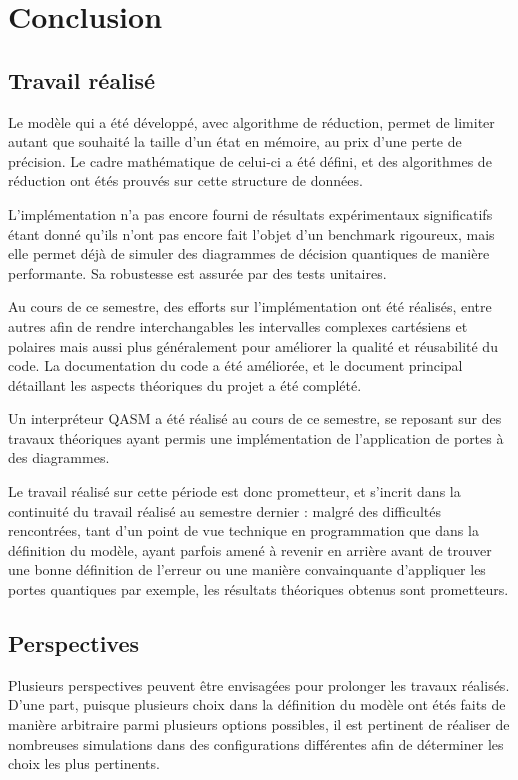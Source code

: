 
\chapter{Conclusion} %
\label{ch:Conclusion}

\section{Travail réalisé}

Le modèle qui a été développé, avec algorithme de réduction, permet de limiter autant que souhaité la taille d'un état en mémoire, au prix d'une perte de précision. Le cadre mathématique de celui-ci a été défini, et des algorithmes de réduction ont étés prouvés sur cette structure de données.

L'implémentation n'a pas encore fourni de résultats expérimentaux significatifs étant donné qu'ils n'ont pas encore fait l'objet d'un benchmark rigoureux, mais elle permet déjà de simuler des diagrammes de décision quantiques de manière performante. Sa robustesse est assurée par des tests unitaires.

Au cours de ce semestre, des efforts sur l'implémentation ont été réalisés, entre autres afin de rendre interchangables les intervalles complexes cartésiens et polaires mais aussi plus généralement pour améliorer la qualité et réusabilité du code. La documentation du code a été améliorée, et le document principal détaillant les aspects théoriques du projet a été complété.

Un interpréteur QASM a été réalisé au cours de ce semestre, se reposant sur des travaux théoriques ayant permis une implémentation de l'application de portes à des diagrammes.

Le travail réalisé sur cette période est donc prometteur, et s'incrit dans la continuité du travail réalisé au semestre dernier : malgré des difficultés rencontrées, tant d'un point de vue technique en programmation que dans la définition du modèle, ayant parfois amené à revenir en arrière avant de trouver une bonne définition de l'erreur ou une manière convainquante d'appliquer les portes quantiques par exemple, les résultats théoriques obtenus sont prometteurs.

\section{Perspectives}

Plusieurs perspectives peuvent être envisagées pour prolonger les travaux réalisés. D'une part, puisque plusieurs choix dans la définition du modèle ont étés faits de manière arbitraire parmi plusieurs options possibles, il est pertinent de réaliser de nombreuses simulations dans des configurations différentes afin de déterminer les choix les plus pertinents.

